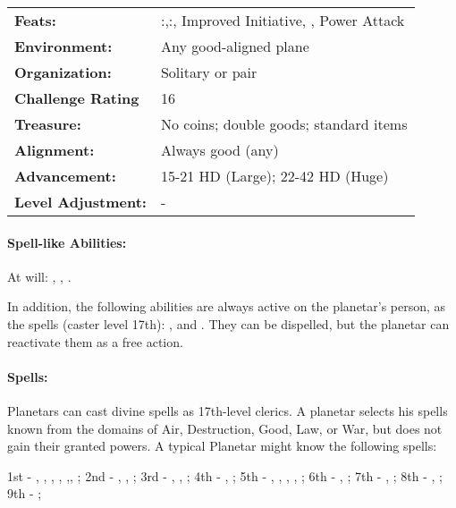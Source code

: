 \begin{table*}
{\begin{tabular}{|p{}|p{}|}
\textbf{Feats:}			&\nameref{Feat:ExpandedKnowledge}:\nameref{Spell:CureWounds},\nameref{Feat:ExpandedKnowledge}:\nameref{Spell:RaiseDead}, Improved Initiative, \nameref{Feat:QuickenSpell}, Power Attack\\
\textbf{Environment:}		&Any good-aligned plane\\
\textbf{Organization:}		&Solitary or pair\\
\textbf{Challenge Rating}	&16\\
\textbf{Treasure:}		&No coins; double goods; standard items\\
\textbf{Alignment:}		&Always good (any)\\
\textbf{Advancement:}		&15-21 HD (Large); 22-42 HD (Huge)\\
\textbf{Level Adjustment:}	&-\\
\hline \end{tabular}}
\end{table*}
\paragraph{Spell-like Abilities:}
At will: , , .

In addition, the following abilities are always active on the planetar's person, as the spells (caster level 17th): , and . They can be dispelled, but the planetar can reactivate them as a free action.
\paragraph{Spells:} Planetars can cast divine spells as 17th-level clerics. A planetar selects his spells known from the domains of Air, Destruction, Good, Law, or War, but does not gain their granted powers. A typical Planetar might know the following spells:

1st - , , , , ,, ;
2nd - , , ;
3rd - , , ;
4th - , ;
5th - , , , , ;
6th - , ;
7th - , ;
8th - , ;
9th - ;

